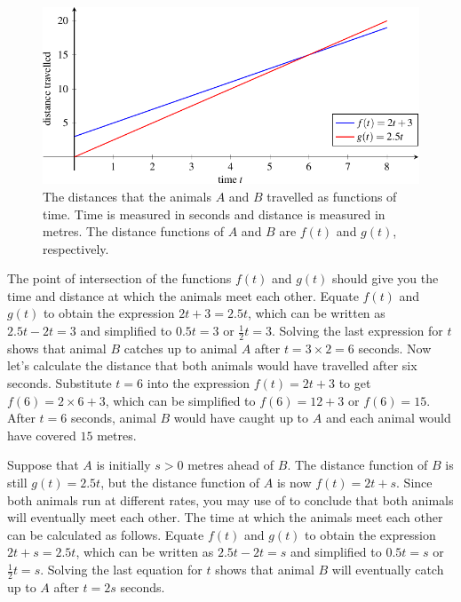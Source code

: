 \documentclass[a4paper,oneside,12pt]{article}
\begin{document}
\begin{problem}
{\begin{solution}
\begin{figure}[!htbp]
\centering
\includegraphics[scale=1]{image/06/rat-race.pdf}
\caption{%
  The distances that the animals $A$ and $B$ travelled as functions of
  time.  Time is measured in seconds and distance is measured in
  metres.  The distance functions of $A$ and $B$ are $f(t)$ and
  $g(t)$, respectively.
}
\label{fig:distances_as_functions_of_time}
\end{figure}

The point of intersection of the functions $f(t)$ and $g(t)$ should
give you the time and distance at which the animals meet each other.
Equate $f(t)$ and $g(t)$ to obtain the expression $2t + 3 = 2.5t$,
which can be written as $2.5t - 2t = 3$ and simplified to
$0.5t = 3$ or $\frac{1}{2}t = 3$.  Solving the last expression for $t$
shows that animal $B$ catches up to animal $A$ after
$t = 3 \times 2 = 6$ seconds.  Now let's calculate the distance that
both animals would have travelled after six seconds.  Substitute
$t = 6$ into the expression $f(t) = 2t + 3$ to get
$f(6) = 2 \times 6 + 3$, which can be simplified to $f(6) = 12 + 3$ or
$f(6) = 15$.  After $t = 6$ seconds, animal $B$ would have caught up
to $A$ and each animal would have covered $15$ metres.

Suppose that $A$ is initially $s > 0$ metres ahead of $B$.  The
distance function of $B$ is still $g(t) = 2.5t$, but the distance
function of $A$ is now $f(t) = 2t + s$.  Since both animals run at
different rates, you may
use 
of  to conclude that
both animals will eventually meet each other.  The time at which the
animals meet each other can be calculated as follows.  Equate $f(t)$
and $g(t)$ to obtain the expression $2t + s = 2.5t$, which can be
written as $2.5t - 2t = s$ and simplified to $0.5t = s$ or
$\frac{1}{2} t = s$.  Solving the last equation for $t$ shows that
animal $B$ will eventually catch up to $A$ after $t = 2s$ seconds.
\end{solution}
}{}


\end{problem}
\end{document}
